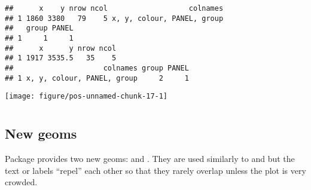 \documentclass[paper=a4,10pt,div=17,headsepline,BCOR=12mm,twoside,open=right]{scrbook}\usepackage{knitr}
\begin{document}
\begin{knitrout}\footnotesize
{}\color{fgcolor}\begin{kframe}
\begin{alltt}
\hlopt{$} \hlkwb{<-} \hlopt{$} \hlopt{>=} \hlstd{,} \hlstd{,} \hlstd{)}
    \hlopt{+}
  \hlstd{()} \hlopt{+}
  \hlstd{(} \hlstd{=} \hlstd{,}  \hlstd{=} \hlstd{(}\hlstd{))}
\end{alltt}
\begin{verbatim}
##      x    y nrow ncol                   colnames
## 1 1860 3380   79    5 x, y, colour, PANEL, group
##   group PANEL
## 1     1     1
##      x      y nrow ncol
## 1 1917 3535.5   35    5
##                     colnames group PANEL
## 1 x, y, colour, PANEL, group     2     1
\end{verbatim}
\end{kframe}

{\centering \texttt{[image: figure/pos-unnamed-chunk-17-1]} 

}



\end{knitrout}

\section[ggrepel]{\ggrepel}

\subsection{New geoms}

Package \ggrepel provides two new geoms:  and . They are used similarly to  and  but the text or labels ``repel'' each other so that they rarely overlap unless the plot is very crowded. 


\begin{knitrout}\footnotesize
{}\color{fgcolor}\begin{kframe}
\begin{alltt}
\hlstd{(}\hlopt{:}
\hlstd{(}\hlopt{:}
\hlstd{(}\hlopt{:}
\end{alltt}
\end{kframe}
\end{knitrout}
\end{document}
